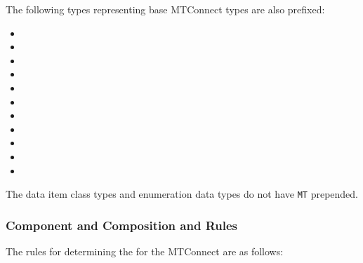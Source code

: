 The following types representing base MTConnect types are also prefixed:

\begin{itemize}
  \setlength\itemsep{0em}
  \item {}
  \item {}
  \item {}
  \item {}
  \item {}
  \item {}
  \item {}
  \item {}
  \item {}
  \item {}
  \item {}
\end{itemize}

The data item class types and enumeration data types do not have \texttt{MT} prepended.

\subsubsection{Component and Composition  and  Rules}

The rules for determining the  for the MTConnect  are as follows:

